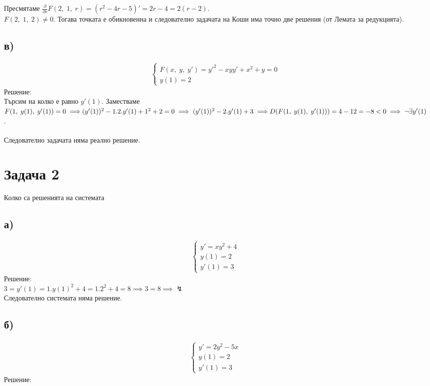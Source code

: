 \documentclass[a4paper, 12pt, oneside]{article}
\begin{document}
Пресмятаме $\frac{\partial}{\partial r} F(2, \; 1, \; r) = (r^2 - 4r - 5)' = 2r - 4 = 2(r - 2)$. \\

$F(2, \; 1, \; 2) \neq 0$. Тогава точката е обикновенна и
следователно задачата на Коши има точно две решения (от Лемата за редукцията).
\subsection{в)}
\begin{align*}
    \begin{cases}
        F(x, \; y, \; y') = y'^2 - xyy' + x^2 + y = 0\\
        y(1) = 2
    \end{cases}
\end{align*}
Решение: \\

Търсим на колко е равно $y'(1)$. Заместваме $F(1, \; y(1), \; y'(1)) = 0 \implies \\\\
(y'(1))^2 - 1.2.y'(1) + 1^2 + 2 = 0 \implies (y'(1))^2 - 2.y'(1) + 3 \implies \\\\
D(F(1, \; y(1), \; y'(1))) = 4 - 12 = -8 < 0 \implies \lnot\exists y'(1)$. \\\\
Следователно задачата няма реално решение.

\section{Задача 2}
Колко са решенията на системата
\subsection{а)}
\begin{align*}
    \begin{cases}
        y' = xy^2 + 4 \\
        y(1) = 2 \\
        y'(1) = 3
    \end{cases}
\end{align*}
Решение: \\

$3 = y'(1) = 1.y(1)^2 + 4 = 1.2^2 + 4 = 8 \implies 3 = 8 \implies \lightning$ \\

Следователно системата няма решение.
\subsection{б)}
\begin{align*}
    \begin{cases}
        y' = 2y^2 - 5x \\
        y(1) = 2 \\
        y'(1) = 3
    \end{cases}
\end{align*}
Решение: \\
\end{document}
